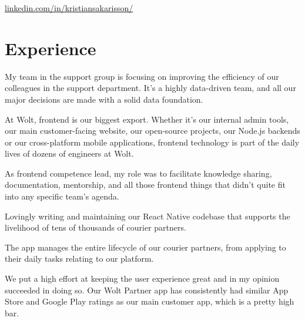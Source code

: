 \documentclass[]{deedy-resume-openfont}
\begin{document}

\href{https://www.linkedin.com/in/kristiansakarisson/}{linkedin.com/in/kristiansakarisson/}

\section{Experience}

\begin{tightemize}
\item My team in the support group is focusing on improving the efficiency of our colleagues in the support department. It's a highly data-driven team, and all our major decisions are made with a solid data foundation.
\end{tightemize}
\sectionsep

\begin{tightemize}
\item At Wolt, frontend is our biggest export. Whether it's our internal admin tools, our main customer-facing website, our open-source projects, our Node.js backends or our cross-platform mobile applications, frontend technology is part of the daily lives of dozens of engineers at Wolt.

\item As frontend competence lead, my role was to facilitate knowledge sharing, documentation, mentorship, and all those frontend things that didn't quite fit into any specific team's agenda.
\end{tightemize}
\sectionsep

\begin{tightemize}
\item Lovingly writing and maintaining our React Native codebase that supports the livelihood of tens of thousands of courier partners.
\item The app manages the entire lifecycle of our courier partners, from applying to their daily tasks relating to our platform. 
\item We put a high effort at keeping the user experience great and in my opinion succeeded in doing so. Our Wolt Partner app has consistently had similar App Store and Google Play ratings as our main customer app, which is a pretty high bar.
\end{tightemize}
\sectionsep
\end{document}
